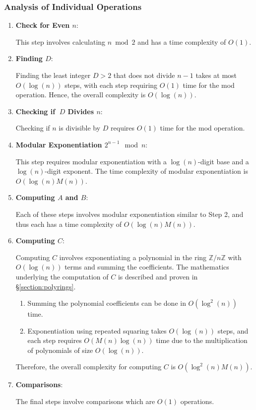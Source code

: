 \documentclass{article}
\theoremstyle{plain}
\theoremstyle{definition}
\begin{document}
\subsubsection{Analysis of Individual Operations}
\begin{enumerate}
    \item \textbf{Check for Even \( n \)}:
    
        This step involves calculating $n \bmod{2}$ and has a time complexity of \( O(1) \).

    \item \textbf{Finding \( D \)}:
    
        Finding the least integer \( D > 2 \) that does not divide \( n-1 \) takes at most \( O(\log(n)) \) steps, with each step requiring \( O(1) \) time for the mod operation. Hence, the overall complexity is \( O(\log(n)) \).

    \item \textbf{Checking if \(\ D \) Divides \( n \)}:
    
        Checking if \( n \) is divisible by $D$ requires \( O(1) \) time for the mod operation.

    \item \textbf{Modular Exponentiation \( 2^{n-1} \mod n \)}:
    
        This step requires modular exponentiation with a \( \log(n) \)-digit base and a \( \log(n) \)-digit exponent. The time complexity of modular exponentiation is \( O(\log(n) M(n)) \).

    \item \textbf{Computing \( A \) and \( B \)}:
    
        Each of these steps involves modular exponentiation similar to Step 2, and thus each has a time complexity of \( O(\log(n) M(n)) \).

    \item \textbf{Computing \( C \)}:
    
        Computing \( C \) involves exponentiating a polynomial in the ring \(\mathbb{Z}/n\mathbb{Z}\) with \( O(\log(n)) \) terms and summing the coefficients. The mathematics underlying the computation of \( C \) is described and proven in \S \ref{section:polyrings}.
        \begin{enumerate}
            \item Summing the polynomial coefficients can be done in \( O(\log^2(n)) \) time.
            \item Exponentiation using repeated squaring takes \( O(\log(n)) \) steps, and each step requires \( O(M(n)\log(n)) \) time due to the multiplication of polynomials of size \( O(\log(n)) \).
        \end{enumerate}
         Therefore, the overall complexity for computing \( C \) is \( O(\log^2(n) M(n)) \).
         
    \item \textbf{Comparisons}:
    
        The final steps involve comparisons which are \( O(1) \) operations.
\end{enumerate}
\end{document}
